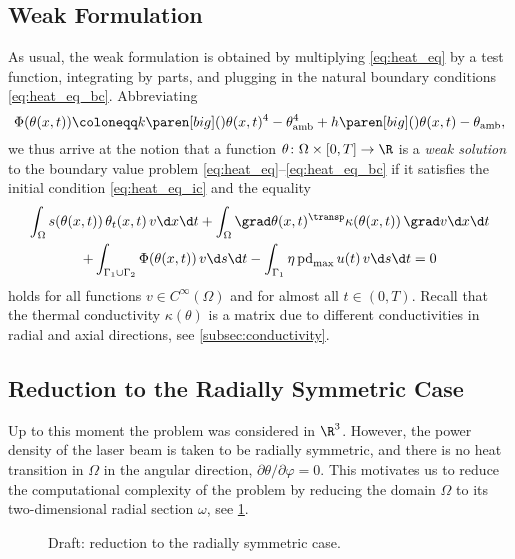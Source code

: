 \subsection{Weak Formulation}

As usual, the weak formulation is obtained by multiplying \eqref{eq:heat_eq} by a test function, integrating by parts, and plugging in the natural boundary conditions \eqref{eq:heat_eq_bc}.
Abbreviating
\begin{equation*}
	\Phi(\theta(x,t)) 
	\coloneqq 
	k \paren[big](){\theta(x,t)^4 - \theta_\textup{amb}^4} + h \paren[big](){\theta(x,t) - \theta_\textup{amb}}
	,
\end{equation*}
we thus arrive at the notion that a function $\theta \colon \Omega \times [0,T] \to \R$ is a \emph{weak solution} to the boundary value problem \eqref{eq:heat_eq}--\eqref{eq:heat_eq_bc} if it satisfies the initial condition \eqref{eq:heat_eq_ic} and the equality
\begin{multline} \label{eq:weak}
	\int_\Omega s(\theta(x,t)) \, \theta_t(x,t) \, v \d x \d t
	+
	\int_\Omega \grad \theta(x,t)^\transp \kappa(\theta(x,t)) \, \grad v \d x \d t 
	\\
	+
	\int_{\Gamma_1 \cup \Gamma_2} \Phi(\theta(x,t))\, v\d s \d t -
	\int_{\Gamma_1} \eta \, \text{pd}_{\max} \, u(t) \, v \d s \d t 
	= 
	0
\end{multline}
holds for all functions $v \in C^\infty(\Omega)$ and for almost all $t \in (0,T)$.
Recall that the thermal conductivity $\kappa(\theta)$ is a matrix due to different conductivities in radial and axial directions, see \cref{subsec:conductivity}.


\subsection{Reduction to the Radially Symmetric Case}

Up to this moment the problem was considered in $\R^3$.
However, the power density of the laser beam is taken to be radially symmetric, and there is no heat transition in $\Omega$ in the angular direction, \ie $\partial\theta/\partial\varphi = 0$. 
This motivates us to reduce the computational complexity of the problem by reducing the domain $\Omega$ to its two-dimensional radial section $\omega$, see \cref{fig:sec}.

\begin{figure}
	\centering
	
	
	\caption{Draft: reduction to the radially symmetric case.}
	\label{fig:sec}
\end{figure}

